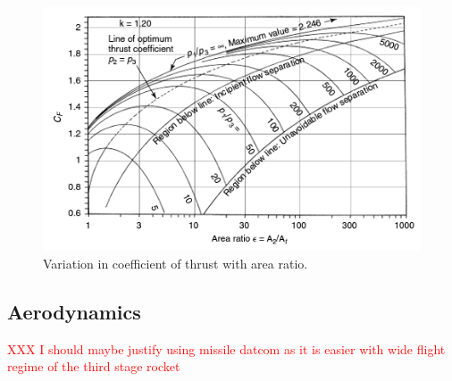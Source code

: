 		
		
		
		\begin{figure}[ht]
			\centering
			\includegraphics[width=0.7\linewidth]{"figures/3_vehicle_design/Thrust Coefficient - Arat"}
			\caption{Variation in coefficient of thrust with area ratio\cite{RPE}.}
			\label{fig:ThrustCoefficient-Arat}
		\end{figure}

		\subsection{Aerodynamics}\label{sec:thirdstageaero}
		
		\textcolor{red}{XXX I should maybe justify using missile datcom as it is easier with wide flight regime of the third stage rocket}
		
